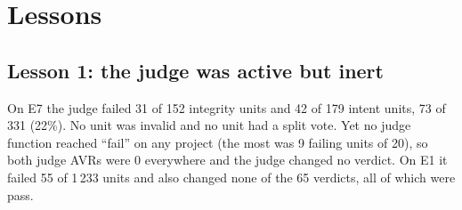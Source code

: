 \documentclass[10pt,a4paper]{article}
\begin{document}
\section{Lessons}\label{sec:lessons}

\subsection{Lesson 1: the judge was active but inert}\label{sec:l1}

On E7 the judge failed 31 of 152 integrity units and 42 of 179 intent units, 73 of 331 (22\%). No unit was invalid
and no unit had a split vote.
Yet no judge function reached ``fail'' on any project (the most was 9 failing units of 20), so both judge AVRs were
0 everywhere and the judge changed no verdict. On E1 it failed 55 of 1\,233 units and also changed none of the 65
verdicts, all of which were pass.
\end{document}
